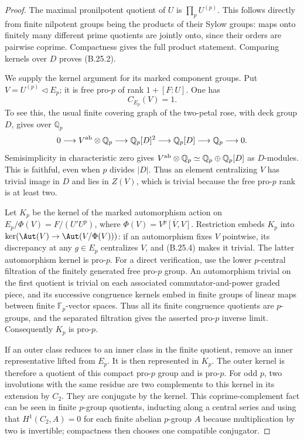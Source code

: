 \begin{proof}
The maximal pronilpotent quotient of $U$ is
$\prod_p U^{(p)}$. This follows directly from finite nilpotent
groups being the products of their Sylow groups: maps onto
finitely many different prime quotients are jointly onto,
since their orders are pairwise coprime. Compactness gives
the full product statement. Comparing kernels over $D$
proves (B.25.2).

We supply the kernel argument for its marked component groups.
Put $V=U^{(p)}\triangleleft E_p$; it is free pro-$p$ of rank
$1+[F:U]$. One has
\[
                         C_{E_p}(V)=1.
 \tag{B.25.4}
\]
To see this, the usual finite covering graph of the two-petal
rose, with deck group $D$, gives over $\mathbb Q_p$
\[
 0\longrightarrow V^{\rm ab}\otimes\mathbb Q_p
  \longrightarrow\mathbb Q_p[D]^2
  \longrightarrow\mathbb Q_p[D]
  \longrightarrow\mathbb Q_p\longrightarrow0.
\]
Semisimplicity in characteristic zero gives
$V^{\rm ab}\otimes\mathbb Q_p\simeq
\mathbb Q_p\oplus\mathbb Q_p[D]$ as $D$-modules. This is
faithful, even when $p$ divides $|D|$. Thus an element
centralizing $V$ has trivial image in $D$ and lies in $Z(V)$,
which is trivial because the free pro-$p$ rank is at least two.

Let $K_p$ be the kernel of the marked automorphism action on
$E_p/\Phi(V)=F/(U'U^p)$, where
$\Phi(V)=\overline{V^p[V,V]}$. Restriction embeds $K_p$ into
$\ker(\Aut(V)\to\Aut(V/\Phi(V)))$: if an automorphism fixes
$V$ pointwise, its discrepancy at any $g\in E_p$ centralizes
$V$, and (B.25.4) makes it trivial. The latter automorphism
kernel is pro-$p$. For a direct verification, use the lower
$p$-central filtration of the finitely generated free pro-$p$
group. An automorphism trivial on the first quotient is trivial
on each associated commutator-and-power graded piece, and its
successive congruence kernels embed in finite groups of linear
maps between finite $\mathbb F_p$-vector spaces. Thus all its
finite congruence quotients are $p$-groups, and the separated
filtration gives the asserted pro-$p$ inverse limit.
Consequently $K_p$ is pro-$p$.

If an outer class reduces to an inner class in the finite
quotient, remove an inner representative lifted from $E_p$.
It is then represented in $K_p$. The outer kernel is therefore
a quotient of this compact pro-$p$ group and is pro-$p$.
For odd $p$, two involutions with the same residue are two
complements to this kernel in its extension by $C_2$.
They are conjugate by the kernel. This coprime-complement
fact can be seen in finite $p$-group quotients, inducting along
a central series and using that $H^1(C_2,A)=0$ for each finite
abelian $p$-group $A$ because multiplication by two is invertible;
compactness then chooses one compatible conjugator.


\end{proof}
